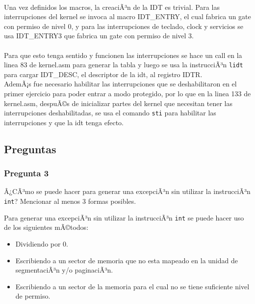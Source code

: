 \documentclass[10pt, a4paper]{article}
\begin{document}
\\
Una vez definidos los macros, la creaciÃ³n de la IDT es trivial. Para las interrupciones del kernel se invoca al macro IDT\_ENTRY, el cual fabrica un gate con permiso de nivel 0, y para las interrupciones de teclado, clock y servicios se usa IDT\_ENTRY3 que fabrica un gate con permiso de nivel 3.
\\\\
Para que esto tenga sentido y funcionen las interrupciones se hace un call en la linea 83 de kernel.asm para generar la tabla y luego se usa la instrucciÃ³n \texttt{lidt} para cargar IDT\_DESC, el descriptor de la idt, al registro IDTR.\\
AdemÃ¡s fue necesario habilitar las interrupciones que se deshabilitaron en el primer ejercicio para poder entrar a modo protegido, por lo que en la linea 133 de kernel.asm, despuÃ©s de inicializar partes del kernel que necesitan tener las interrupciones deshabilitadas, se usa el comando \texttt{sti} para habilitar las interrupciones y que la idt tenga efecto.
\subsection{Preguntas}
\subsubsection*{Pregunta 3}
 \begin{framed}
Â¿CÃ³mo se puede hacer para generar una excepciÃ³n sin utilizar la instrucciÃ³n \texttt{int}? Mencionar al menos 3 formas posibles.
\end{framed}
Para generar una excepciÃ³n sin utilizar la instrucciÃ³n \texttt{int} se puede hacer uso de los siguientes mÃ©todos:
\begin{itemize}
	\item Dividiendo por 0.
	\item Escribiendo a un sector de memoria que no esta mapeado en la unidad de segmentaciÃ³n y/o paginaciÃ³n.
	\item Escribiendo a un sector de la memoria para el cual no se tiene suficiente nivel de permiso.
\end{itemize}
\end{document}
